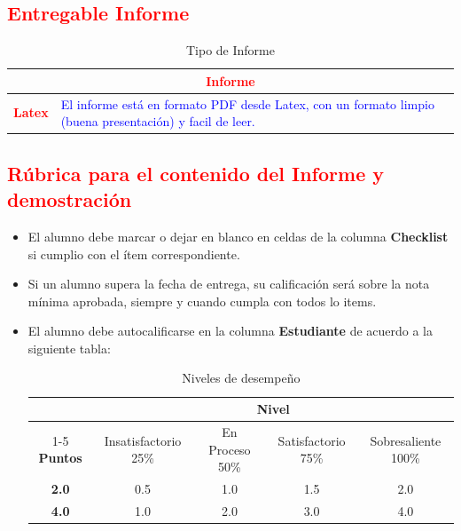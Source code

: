 \documentclass{article}
\begin{document}
	\subsection{\textcolor{red}{Entregable Informe}}
	\begin{table}[H]
		\caption{Tipo de Informe}
		\setlength{\tabcolsep}{0.5em} %
		{\renewcommand{\arraystretch}{1.5}%
		
		\begin{tabular}{|p{3cm}|p{12cm}|}
			\hline
			\multicolumn{2}{|c|}{\textbf{\textcolor{red}{Informe}}}  \\
			\hline 
			\textbf{\textcolor{red}{Latex}} & \textcolor{blue}{El informe está en formato PDF desde Latex,  con un formato limpio (buena presentación) y facil de leer.}   \\ 
			\hline 
			
			
		\end{tabular}
	}
	\end{table}
	\subsection{\textcolor{red}{Rúbrica para el contenido del Informe y demostración}}
	\begin{itemize}			
		\item El alumno debe marcar o dejar en blanco en celdas de la columna \textbf{Checklist} si cumplio con el ítem correspondiente.
		\item Si un alumno supera la fecha de entrega,  su calificación será sobre la nota mínima aprobada, siempre y cuando cumpla con todos lo items.
		\item El alumno debe autocalificarse en la columna \textbf{Estudiante} de acuerdo a la siguiente tabla:
	
		\begin{table}[ht]
			\caption{Niveles de desempeño}
			\begin{center}
			\begin{tabular}{ccccc}
    			\hline
    			 & \multicolumn{4}{c}{Nivel}\\
    			\cline{1-5}
    			\textbf{Puntos} & Insatisfactorio 25\%& En Proceso 50\% & Satisfactorio 75\% & Sobresaliente 100\%\\
    			\textbf{2.0}&0.5&1.0&1.5&2.0\\
    			\textbf{4.0}&1.0&2.0&3.0&4.0\\
    		\hline
			\end{tabular}
		\end{center}
	\end{table}	
	
	\end{itemize}
	
\end{document}
